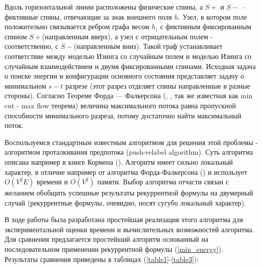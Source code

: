 Вдоль горизонтальной линии расположены физические спины, а $S+$ и $S-$ -- фиктивные спины, отвечающие за знак внешнего поля $h$. Узел, в котором поле положительно связывается ребром графа весом $h_i$ с фиктивным фиксированным спином $S+$(направленным вверх), а узел с отрицательным полем - соответственно, с $S-$(направленным вниз). Такой граф устанавливает соответствие между моделью Изинга со случайным полем и моделью Изинга со случайным взаимодействием и двумя фиксированными спинами. Исходная задача о поиске энергии и конфигурации основного состояния представляет задачу о минимальном $s-t$ разрезе (этот разрез отделяет спины направленные в разные стороны). Согласно Теореме Форда — Фалкерсона (\cite{ford1962d}, \cite{ford1956maximal}, так же известная как min cut - max flow теорема) величина максимального потока равна пропускной способности минимального разреза, потому достаточно найти максимальный поток.

Воспользуемся стандартным известным алгоритмом для решения этой проблемы - алгоритмом проталкивания предпотока (push-relabel algorithm). Суть алгоритма описана например в книге Кормена (\cite{cormen2009introduction}). Алгоритм имеет сильно локальный характер, в отличие например от алгоритма Форда-Фалкерсона (\cite{ford1956maximal}) и использует $O(V^2 E)$ времени и $O(V^2)$ памяти. Выбор алгоритма отчасти связан с желанием обобщить успешные результаты рекуррентной формулы на двумерный случай (рекуррентные формулы, очевидно, носят сугубо локальный характер).

В ходе работы была разработана простейшая реализация этого алгоритма для экспериментальной оценки времени и вычислительных возможностей алгоритма. Для сравнения предлагается простейший алгоритм основанный на последовательном применении рекуррентной формулы (\ref{min_energy}). Результаты сравнения приведены в таблицах (\ref{table1}-\ref{table3}):

